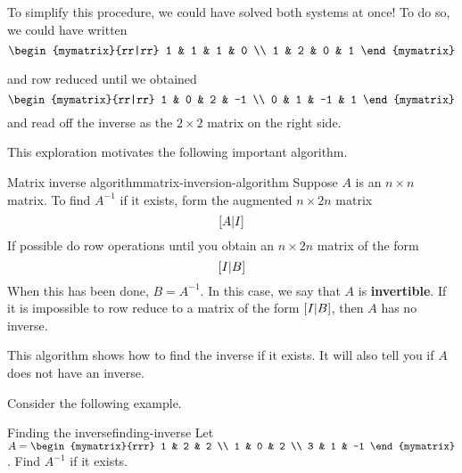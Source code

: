 To simplify this procedure, we could have solved both systems at once!
To do so, we could have written
\begin{equation*}
  \begin{mymatrix}{rr|rr}
    1 & 1 & 1 & 0 \\
    1 & 2 & 0 & 1
  \end{mymatrix}
\end{equation*}

and row reduced until we obtained
\begin{equation*}
  \begin{mymatrix}{rr|rr}
    1 & 0 & 2 & -1 \\
    0 & 1 & -1 & 1
  \end{mymatrix}
\end{equation*}
and read off the inverse as the $2\times 2$ matrix on the right side.

This exploration motivates the following important algorithm.

\begin{algorithm}{Matrix inverse algorithm}{matrix-inversion-algorithm}
  Suppose $A$ is an $n\times n$ matrix. To find $A^{-1}$ if it
  exists, form the augmented
  $n\times 2n$ matrix
  \begin{equation*}
    \left[A|I\right]
  \end{equation*}
  If possible do row operations until you obtain an $n\times 2n$
  matrix of the form
  \begin{equation*}
    \left[I|B\right]  
  \end{equation*}
  When this has been done, $B=A^{-1}$. In this case, we say that $A$
  is \textbf{invertible}.  If it is impossible to row reduce to a
  matrix of the form $\left[I|B\right]$, then $A$ has no inverse.
\end{algorithm}

This algorithm shows how to find the inverse if it exists. It will also tell you if
$A$ does not have an inverse. 

Consider the following example.

\begin{example}{Finding the inverse}{finding-inverse}
  Let $A=\begin{mymatrix}{rrr}
    1 & 2 & 2 \\
    1 & 0 & 2 \\
    3 & 1 & -1
  \end{mymatrix} $. Find $A^{-1}$ if it exists.
\end{example}

